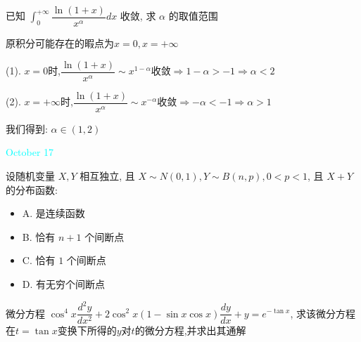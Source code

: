 \begin{example}[][Exam: 36.3.4]
	已知 $\int_{0}^{+\infty}\dfrac{\ln(1+x)}{x^{\alpha}}dx$ 收敛, 求 $\alpha$ 的取值范围
\end{example}

\begin{solution}

	原积分可能存在的暇点为$x=0,x=+\infty$
	
	(1). $x=0$时,$\dfrac{\ln(1+x)}{x^{\alpha}}\sim x^{1-\alpha}$收敛$\Rightarrow 1-\alpha>-1\Rightarrow \alpha<2$
	
	(2). $x=+\infty$时,$\dfrac{\ln(1+x)}{x^{\alpha}}\sim x^{-\alpha}$收敛$\Rightarrow -\alpha<-1\Rightarrow \alpha>1$
	
	我们得到:  $\alpha\in(1,2)$
\end{solution}


\textcolor{cyan}{October 17}

\begin{example}[][Exam: 36.3.5]
	设随机变量 $X,Y$ 相互独立, 且 $X\sim N(0,1), Y\sim B(n,p), 0<p<1$, 且 $X+Y$ 的分布函数:  
\begin{itemize}
	\item A. 是连续函数
	\item B. 恰有 $n+1$ 个间断点
	\item C. 恰有 $1$ 个间断点
	\item D. 有无穷个间断点
\end{itemize}
\end{example}

\begin{solution}
	
\end{solution}

\begin{example}[][Exam: 36.3.6]
	微分方程 $\cos^4 x\dfrac{d^2y}{dx^2}+2\cos^2 x(1-\sin x\cos x)\dfrac{dy}{dx}+y=e^{-\tan x}$,
	求该微分方程在$t=\tan x$变换下所得的$y$对$t$的微分方程,并求出其通解
\end{example}


